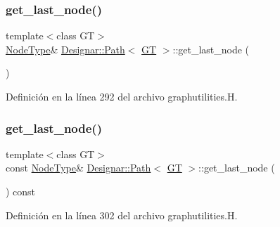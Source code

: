 \subsubsection{\texorpdfstring{get\+\_\+last\+\_\+node()}{get\_last\_node()}\hspace{0.1cm}{\footnotesize\ttfamily [1/2]}}
{\footnotesize\ttfamily template$<$class GT$>$ \\
\hyperlink{class_designar_1_1_path_a7b499fd50e96e3360968d4cfef7a3736}{Node\+Type}\& \hyperlink{class_designar_1_1_path}{Designar\+::\+Path}$<$ \hyperlink{demo-buildgraph_8_c_a3001c40d2c31ca87ed96cd7d1334a55e}{GT} $>$\+::get\+\_\+last\+\_\+node (\begin{DoxyParamCaption}{ }\end{DoxyParamCaption})\hspace{0.3cm}{\ttfamily [inline]}}



Definición en la línea 292 del archivo graphutilities.\+H.

\mbox{\label{class_designar_1_1_path_a4e80971589c8317a2e7f11c642ad2e19}} 
\subsubsection{\texorpdfstring{get\+\_\+last\+\_\+node()}{get\_last\_node()}\hspace{0.1cm}{\footnotesize\ttfamily [2/2]}}
{\footnotesize\ttfamily template$<$class GT$>$ \\
const \hyperlink{class_designar_1_1_path_a7b499fd50e96e3360968d4cfef7a3736}{Node\+Type}\& \hyperlink{class_designar_1_1_path}{Designar\+::\+Path}$<$ \hyperlink{demo-buildgraph_8_c_a3001c40d2c31ca87ed96cd7d1334a55e}{GT} $>$\+::get\+\_\+last\+\_\+node (\begin{DoxyParamCaption}{ }\end{DoxyParamCaption}) const\hspace{0.3cm}{\ttfamily [inline]}}



Definición en la línea 302 del archivo graphutilities.\+H.

\mbox{\label{class_designar_1_1_path_aed6cd565cad808bd6d08f0485e89077d}} 
